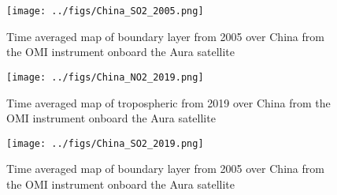 \begin{figure}[htpb]
    \centering
    \texttt{[image: ../figs/China\_SO2\_2005.png]}
    \caption{Time averaged map of boundary layer from 2005 over China
    from the OMI instrument onboard the Aura satellite}
    \label{fig:OMI_China2005_SO2}
\end{figure}

\begin{figure}[htpb]
    \centering
        \texttt{[image: ../figs/China\_NO2\_2019.png]}
    \caption{Time averaged map of tropospheric  from 2019 
    over China from the OMI instrument  
    onboard the Aura satellite}
    \label{fig:OMI_China_2019NO2}
\end{figure}


\begin{figure}[htpb]
    \centering
    \texttt{[image: ../figs/China\_SO2\_2019.png]}
    \caption{Time averaged map of boundary layer from 2005 over China
    from the OMI instrument onboard the Aura satellite}
    \label{fig:OMI_China2019_SO2}
\end{figure}